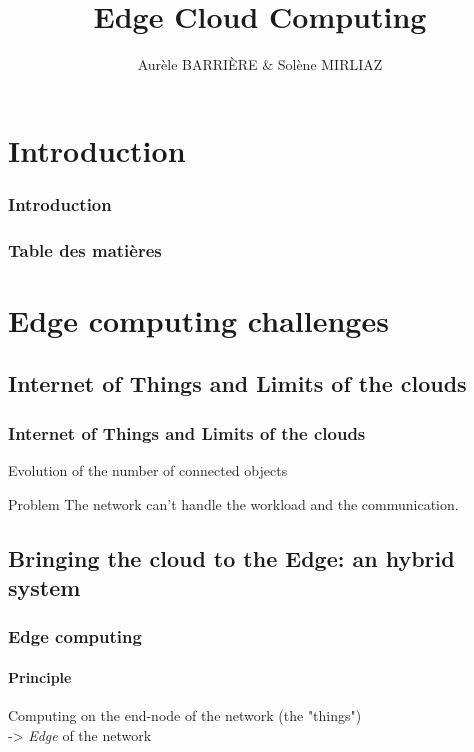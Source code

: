\documentclass[utf8,xcolor=table, page number]{earlywinter}
\begin{document}
\title{Edge Cloud Computing}
\author{Aurèle BARRIÈRE & Solène MIRLIAZ}

\begin{frame}[plain]
  \titlepage%
\end{frame}

\section{Introduction}
\begin{frame}
	\frametitle{Introduction}

\end{frame}

  \begin{frame}
    \frametitle{Table des matières}
    \tableofcontents[]
  \end{frame}
  
  
\section{Edge computing challenges}
\subsection{Internet of Things and Limits of the clouds}
\begin{frame}
  \frametitle{Internet of Things and Limits of the clouds}
  Evolution of the number of connected objects
  
	\begin{alertblock}{Problem}
			The network can't handle the workload and the communication.
	\end{alertblock}
\end{frame}

\subsection{Bringing the cloud to the Edge: an hybrid system}
\begin{frame}
  \frametitle{Edge computing}
  \framesubtitle{Principle}
  Computing on the end-node of the network (the "things")\\
  -> \emph{Edge} of the network
\end{frame}
\end{document}
